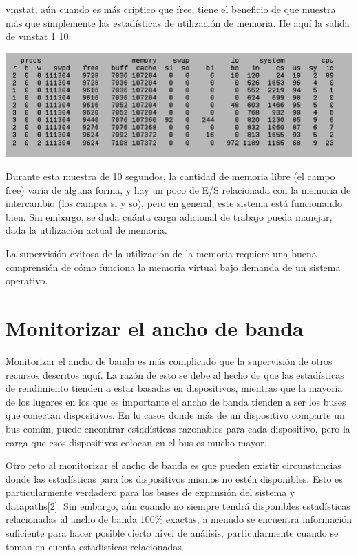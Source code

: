 \documentclass[12pt]{article}
\begin{document}
vmstat, aún cuando es más críptico que free, tiene el beneficio de que muestra más que simplemente las estadísticas de utilización de memoria. He aquí la salida de vmstat 1 10:

\begin{center}
 \includegraphics{vmstat2.png}
\end{center}

      
Durante esta muestra de 10 segundos, la cantidad de memoria libre (el campo free) varía de alguna forma, y hay un poco de E/S relacionada con la memoria de intercambio (los campos si y so), pero en general, este sistema está funcionando bien. Sin embargo, se duda cuánta carga adicional de trabajo pueda manejar, dada la utilización actual de memoria.



La supervisión exitosa de la utilización de la memoria requiere una buena comprensión de cómo funciona la memoria virtual bajo demanda de un sistema operativo. 



\section*{Monitorizar el ancho de banda}
Monitorizar el ancho de banda es más complicado que la supervisión de otros recursos descritos aquí. La razón de esto se debe al hecho de que las estadísticas de rendimiento tienden a estar basadas en dispositivos, mientras que la mayoría de los lugares en los que es importante el ancho de banda tienden a ser los buses que conectan dispositivos. En lo casos donde más de un dispositivo comparte un bus común, puede encontrar estadísticas razonables para cada dispositivo, pero la carga que esos dispositivos colocan en el bus es mucho mayor.

Otro reto al monitorizar el ancho de banda es que pueden existir circunstancias donde las estadísticas para los dispositivos mismos no estén disponibles. Esto es particularmente verdadero para los buses de expansión del sistema y datapaths[2]. Sin embargo, aún cuando no siempre tendrá disponibles estadísticas relacionadas al ancho de banda 100\% exactas, a menudo se encuentra información suficiente para hacer posible cierto nivel de análisis, particularmente cuando se toman en cuenta estadísticas relacionadas.
\end{document}
